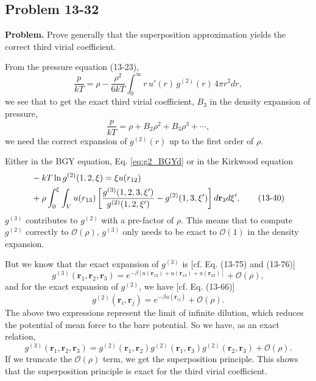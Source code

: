\documentclass[twocolumn, 10pt]{article}
\numberwithin{equation}{section}
\newenvironment{problem}
{\par\medskip \color{problue}
  \textbf{Problem. }\ignorespaces}
{\medskip}
\newenvironment{solution}[1][\empty]
{\par\medskip\sffamily
  \textbf{\ifx\empty#1{Solution.}\relax\else{#1}\fi} \ignorespaces}
{\medskip}
\begin{document}
\subsection{Problem 13-32}

\begin{problem}
  Prove generally that the superposition approximation
  yields the correct third virial coefficient.
\end{problem}

\begin{solution}
  From the pressure equation (13-23),
  \begin{equation}
    \frac{p}{kT}
    =
    \rho - \frac{\rho^2}{6kT}
    \int_0^\infty r \, u'(r) \, g^{(2)}(r) \, 4 \pi r^2 dr
    ,
    \tag{13-23}
  \end{equation}
  we see that to get the exact third virial coefficient, $B_3$
  in the density expansion of pressure,
  $$
  \frac{p}{kT} = \rho + B_2 \rho^2 + B_3 \rho^3 + \cdots,
  $$
  we need the correct expansion of $g^{(2)}(r)$
  up to the first order of $\rho$.

  Either in the BGY equation, Eq. \eqref{eq:g2_BGYd}
  or in the Kirkwood equation
  \begin{align}
    &-kT \ln g^{(2)}(1, 2, \xi)
    =
    \xi u(r_{12})
    \notag \\
    &+
    \rho\int_0^\xi
    \int_V u(r_{13})
    \left[
      \frac{g^{(3)}(1, 2, 3, \xi')}{g^{(2)}(1,2,\xi')}
      -
      g^{(2)}(1, 3, \xi')
      \right] d\mathbf r_3 d\xi'
    ,
    \tag{13-40}
  \end{align}
  $g^{(3)}$ contributes to $g^{(2)}$
  with a pre-factor of $\rho$.
  This means that to compute $g^{(2)}$ correctly
  to $\mathcal O(\rho)$,
  $g^{(3)}$ only needs to be exact
  to $\mathcal O(1)$ in the density expansion.

  But we know that the exact expansion of $g^{(3)}$ is
  [cf. Eq. (13-75) and (13-76)]
  $$
  g^{(3)}(\mathbf r_1, \mathbf r_2, \mathbf r_3)
  =
  e^{-\beta [u(\mathbf r_{12}) + u(\mathbf r_{13}) + u(\mathbf r_{23})]}
  + \mathcal O(\rho)
  ,
  $$
  and for the exact expansion of $g^{(2)}$, we have
  [cf. Eq. (13-66)]
  $$
  g^{(2)}(\mathbf r_i, \mathbf r_j)
  =
  e^{-\beta u(\mathbf r_{ij})}
  + \mathcal O(\rho)
  .
  $$
  The above two expressions represent the limit of
  infinite dilution,
  which reduces
  the potential of mean force to
  the bare potential.
  So we have, as an exact relation,
  $$
  g^{(3)}(\mathbf r_1, \mathbf r_2, \mathbf r_3)
  =
  g^{(2)}(\mathbf r_1, \mathbf r_2)
  g^{(2)}(\mathbf r_1, \mathbf r_3)
  g^{(2)}(\mathbf r_2, \mathbf r_3)
  + \mathcal O(\rho).
  $$
  If we truncate the $\mathcal O(\rho)$ term,
  we get the superposition principle.
  This shows that the superposition principle
  is exact for the third virial coefficient.
\end{solution}
\end{document}
